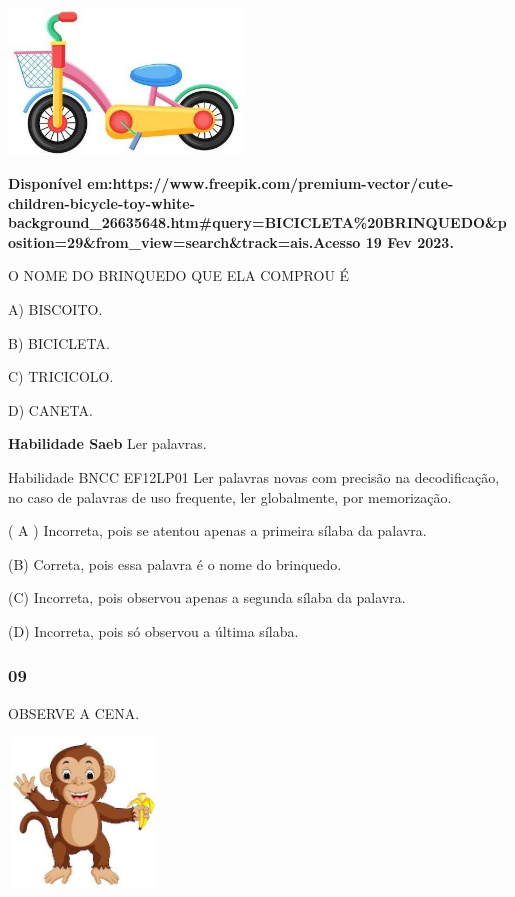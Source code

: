 \includegraphics[width=2.45625in,height=1.54583in]{media/image217.jpg}

\textbf{Disponível
em:https://www.freepik.com/premium-vector/cute-children-bicycle-toy-white-background\_26635648.htm\#query=BICICLETA\%20BRINQUEDO\&position=29\&from\_view=search\&track=ais.Acesso
19 Fev 2023.}

O NOME DO BRINQUEDO QUE ELA COMPROU É

A) BISCOITO.

B) BICICLETA.

C) TRICICOLO.

D) CANETA.

\textbf{Habilidade Saeb} Ler palavras.

Habilidade BNCC EF12LP01 Ler palavras novas com precisão na
decodificação, no caso de palavras de uso frequente, ler globalmente,
por memorização.

\protect\hypertarget{_heading=h.3tbugp1}{}{}( A ) Incorreta, pois se
atentou apenas a primeira sílaba da palavra.

(B) Correta, pois essa palavra é o nome do brinquedo.

(C) Incorreta, pois observou apenas a segunda sílaba da palavra.

(D) Incorreta, pois só observou a última sílaba.

\subsubsection{09}\label{section-49}

OBSERVE A CENA.

\includegraphics[width=1.57569in,height=1.57569in]{media/image218.jpg}

